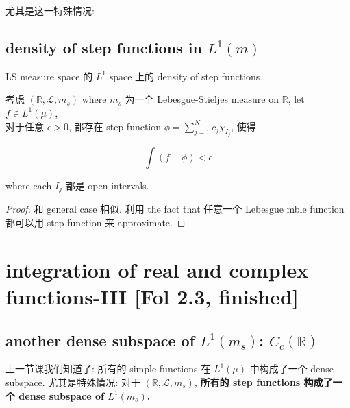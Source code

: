 \documentclass{qlnotes-export}
\begin{document}
尤其是这一特殊情况:

\subsection{\texorpdfstring{density of step functions in \(L^{1}(m)\)}{density of step functions in L\^{}\{1\}(m)}}\label{density-of-step-functions-in-l1m}

\begin{theorem}{LS measure space 的 \(L^{1}\) space 上的 density of step functions}\label{thm-05-integration-of-real-and-complex-functions-ls-measure-space-l-1-space-density-of-step-functions}

考虑 \(({\mathbb{R}},\mathcal{L},m_{s})\) where \(m_{s}\) 为一个 Lebesgue-Stieljes measure on \(\mathbb{R}\), let \(f \in L^{1}(\mu)\),\\
对于任意 \(\epsilon > 0\), 都存在 step function \(\phi = \sum_{j = 1}^{N}c_{j}\chi_{I_{j}}\), 使得

\[\int(f - \phi) < \epsilon\]

where each \(I_{j}\) 都是 open intervals.

\end{theorem}

\begin{proof}

和 general case 相似. 利用 the fact that 任意一个 Lebesgue mble function 都可以用 step function 来 approximate.

\end{proof}

\section{integration of real and complex functions-III {[}Fol 2.3, finished{]}}

\subsection{\texorpdfstring{another dense subspace of \(L^{1}(m_{s})\): \(C_{c}({\mathbb{R}})\)}{another dense subspace of L\^{}\{1\}(m\_\{s\}): C\_\{c\}(\{\textbackslash mathbb\{R\}\})}}\label{another-dense-subspace-of-l1m_s-c_cmathbbr}

上一节课我们知道了: 所有的 simple functions 在 \(L^{1}(\mu)\) 中构成了一个 dense subspace. 尤其是特殊情况: 对于 \(({\mathbb{R}},\mathcal{L},m_{s})\), \textbf{所有的 step functions 构成了一个 dense subspace of \(L^{1}(m_{s})\).}
\end{document}
